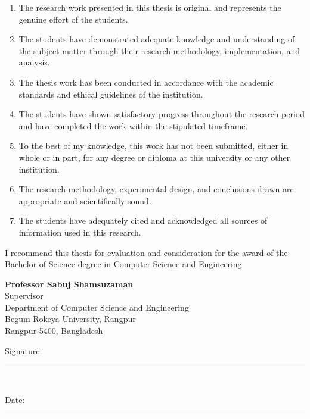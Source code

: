 \documentclass[
  11pt,
  a4paper,
]{article}
\begin{document}
\begin{enumerate}
\item The research work presented in this thesis is original and represents the genuine effort of the students.

\item The students have demonstrated adequate knowledge and understanding of the subject matter through their research methodology, implementation, and analysis.

\item The thesis work has been conducted in accordance with the academic standards and ethical guidelines of the institution.

\item The students have shown satisfactory progress throughout the research period and have completed the work within the stipulated timeframe.

\item To the best of my knowledge, this work has not been submitted, either in whole or in part, for any degree or diploma at this university or any other institution.

\item The research methodology, experimental design, and conclusions drawn are appropriate and scientifically sound.

\item The students have adequately cited and acknowledged all sources of information used in this research.
\end{enumerate}

I recommend this thesis for evaluation and consideration for the award
of the Bachelor of Science degree in Computer Science and Engineering.

\vspace*{3cm}

\begin{center}
\textbf{Professor Sabuj Shamsuzaman}\\
Supervisor\\
Department of Computer Science and Engineering\\
Begum Rokeya University, Rangpur\\
Rangpur-5400, Bangladesh\\

\vspace*{1.5cm}

Signature: \rule{5cm}{0.5pt}\\

\vspace*{0.5cm}

Date: \rule{3cm}{0.5pt}
\end{center}
\end{document}
